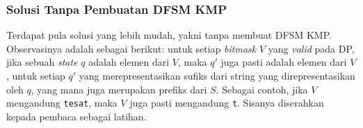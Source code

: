 \documentclass[../main_editorial.tex]{subfiles} %
\begin{document}
\subsubsection*{Solusi Tanpa Pembuatan DFSM KMP}

Terdapat pula solusi yang lebih mudah, yakni tanpa membuat DFSM KMP. Observasinya adalah sebagai berikut: untuk setiap \textit{bitmask} $V$ yang \textit{valid} pada DP, jika sebuah \textit{state} $q$ adalah elemen dari $V$, maka $q'$ juga pasti adalah elemen dari $V$, untuk setiap $q'$ yang merepresentasikan sufiks dari string yang direpresentasikan oleh $q$, yang mana juga merupakan prefiks dari $S$. Sebagai contoh, jika $V$ mengandung \texttt{tesat}, maka $V$ juga pasti mengandung \texttt{t}. Sisanya diserahkan kepada pembaca sebagai latihan.
\end{document}
